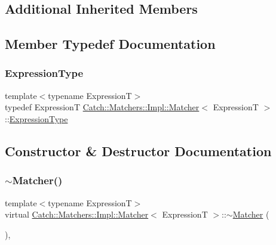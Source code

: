 \subsection*{Additional Inherited Members}


\subsection{Member Typedef Documentation}
\hypertarget{struct_catch_1_1_matchers_1_1_impl_1_1_matcher_a7f5068cbacd1eed06cf243e63446e7e1}{}\label{struct_catch_1_1_matchers_1_1_impl_1_1_matcher_a7f5068cbacd1eed06cf243e63446e7e1} 
\subsubsection{\texorpdfstring{Expression\+Type}{ExpressionType}}
{\footnotesize\ttfamily template$<$typename ExpressionT$>$ \\
typedef ExpressionT \hyperlink{struct_catch_1_1_matchers_1_1_impl_1_1_matcher}{Catch\+::\+Matchers\+::\+Impl\+::\+Matcher}$<$ ExpressionT $>$\+::\hyperlink{struct_catch_1_1_matchers_1_1_impl_1_1_matcher_a7f5068cbacd1eed06cf243e63446e7e1}{Expression\+Type}}



\subsection{Constructor \& Destructor Documentation}
\hypertarget{struct_catch_1_1_matchers_1_1_impl_1_1_matcher_a55e537214a78bbba59f53d3e30336a61}{}\label{struct_catch_1_1_matchers_1_1_impl_1_1_matcher_a55e537214a78bbba59f53d3e30336a61} 
\subsubsection{\texorpdfstring{$\sim$\+Matcher()}{~Matcher()}}
{\footnotesize\ttfamily template$<$typename ExpressionT$>$ \\
virtual \hyperlink{struct_catch_1_1_matchers_1_1_impl_1_1_matcher}{Catch\+::\+Matchers\+::\+Impl\+::\+Matcher}$<$ ExpressionT $>$\+::$\sim$\hyperlink{struct_catch_1_1_matchers_1_1_impl_1_1_matcher}{Matcher} (\begin{DoxyParamCaption}{ }\end{DoxyParamCaption})\hspace{0.3cm}{\ttfamily [inline]}, {\ttfamily [virtual]}}



